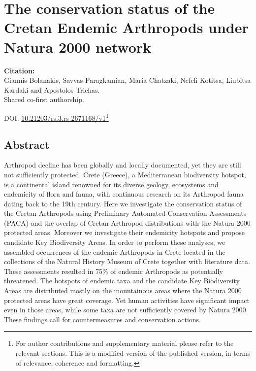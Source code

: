 % 
% 


\chapter{The conservation status of the Cretan Endemic Arthropods under Natura 2000 network}
\label{cha:arthropods}


\textbf{Citation:} \\ 
Giannis Bolanakis, Savvas Paragkamian, Maria Chatzaki, Nefeli Kotitsa, Liubitsa Kardaki and Apostolos Trichas.\\

Shared co-first authorship.

DOI: \href{https://doi.org/10.21203/rs.3.rs-2671168/v1}{10.21203/rs.3.rs-2671168/v1}\footnote{
   For author contributions and supplementary material please refer to the relevant sections. 
   This is a modified version of the published version,
   in terms of relevance, coherence and formatting.
   }



\section{Abstract}

Arthropod decline has been globally and locally documented, yet they are still
not sufficiently protected. Crete (Greece), a Mediterranean biodiversity
hotspot, is a continental island renowned for its diverse geology, ecosystems
and endemicity of flora and fauna, with continuous research on its Arthropod
fauna dating back to the 19th century. Here we investigate the conservation
status of the Cretan Arthropods using Preliminary Automated Conservation
Assessments (PACA) and the overlap of Cretan Arthropod distributions with the
Natura 2000 protected areas. Moreover we investigate their endemicity hotspots
and propose candidate Key Biodiversity Areas. In order to perform these
analyses, we assembled occurrences of the endemic Arthropods in Crete located
in the collections of the Natural History Museum of Crete together with
literature data. These assessments resulted in 75\% of endemic Arthropods as
potentially threatened. The hotspots of endemic taxa and the candidate Key
Biodiversity Areas are distributed mostly on the mountainous areas where the
Natura 2000 protected areas have great coverage. Yet human activities have
significant impact even in those areas, while some taxa are not sufficiently
covered by Natura 2000. These findings call for countermeasures and conservation actions.


